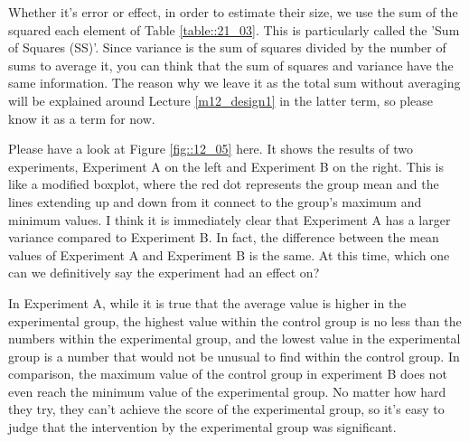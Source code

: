 \documentclass{ltjbook}
\begin{document}
Whether it's error or effect, in order to estimate their size, we use the sum of the squared each element of Table \ref{table::21_03}. This is particularly called the 'Sum of Squares (SS)'. Since variance is the sum of squares divided by the number of sums to average it, you can think that the sum of squares and variance have the same information. The reason why we leave it as the total sum without averaging will be explained around Lecture \ref{m12_design1} in the latter term, so please know it as a term for now.



Please have a look at Figure \ref{fig::12_05} here. It shows the results of two experiments, Experiment A on the left and Experiment B on the right. This is like a modified boxplot, where the red dot represents the group mean and the lines extending up and down from it connect to the group's maximum and minimum values.
I think it is immediately clear that Experiment A has a larger variance compared to Experiment B. In fact, the difference between the mean values of Experiment A and Experiment B is the same. At this time, which one can we definitively say the experiment had an effect on?

In Experiment A, while it is true that the average value is higher in the experimental group, the highest value within the control group is no less than the numbers within the experimental group, and the lowest value in the experimental group is a number that would not be unusual to find within the control group.
In comparison, the maximum value of the control group in experiment B does not even reach the minimum value of the experimental group. No matter how hard they try, they can't achieve the score of the experimental group, so it's easy to judge that the intervention by the experimental group was significant.
\end{document}
